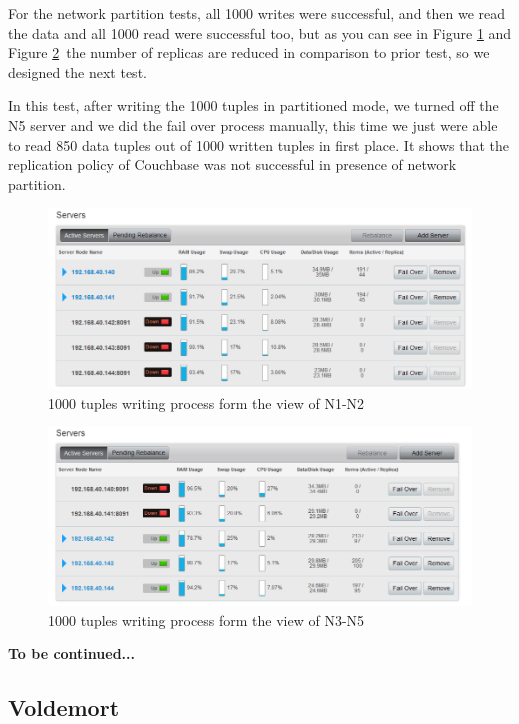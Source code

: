 \documentclass[a4paper]{article}
\begin{document}
For the network partition tests, all 1000 writes were successful, and then we read the data and all 1000 read were successful too, but as you can see in Figure \ref{fig:partition1} and Figure \ref{fig:partition2}\, the number of replicas are reduced in comparison to prior test, so we designed the next test.

In this test, after writing the 1000 tuples in partitioned mode, we turned off the N5 server and we did the fail over process manually, this time we just were able to read 850 data tuples out of 1000 written tuples in first place. It shows that the replication policy of Couchbase was not successful in presence of network partition. 

\begin{figure}[H]
	\centering
	\includegraphics[width=\textwidth]{partition1}
	\caption{1000 tuples writing process form the view of N1-N2}
	\label{fig:partition1}
\end{figure}

\begin{figure}[H]
	\centering
	\includegraphics[width=\textwidth]{partition2}
	\caption{1000 tuples writing process form the view of N3-N5}
	\label{fig:partition2}
\end{figure}

{\bf To be continued...}

\subsection{Voldemort}
\end{document}
